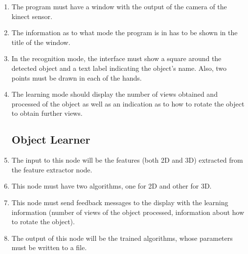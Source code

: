 \documentclass{article}
\makeatletter
\def\threedigits#1{\expandafter\@threedigits\csname c@#1\endcsname}
\def\@threedigits#1{%
  \ifnum#1<100 0\fi
  \ifnum#1<10 0\fi
  \number#1}
\makeatother
\begin{document}
\begin{enumerate}[label=\textbf{FR\threedigits*}, leftmargin=2cm]
\item The program must have a window with the output of the camera of the kinect sensor. 
\item The information as to what mode the program is in has to be shown in the title of the window.
\item In the recognition mode, the interface must show a square around the detected object and a text label indicating the object's name. Also, two points must be drawn in each of the hands. 
\item The learning mode should display the number of views obtained and processed of the object as well as an indication as to how to rotate the object to obtain further views. 


\subsection{Object Learner}
	\item The input to this node will be the features (both 2D and 3D) extracted from the feature extractor node. 
	\item This node must have two algorithms, one for 2D and other for 3D. 
	\item This node must send feedback messages to the display with the learning information (number of views of the object processed, information about how to rotate the object).
	\item The output of this node will be the trained algorithms, whose parameters must be written to a file. 


\end{enumerate}
\end{document}
